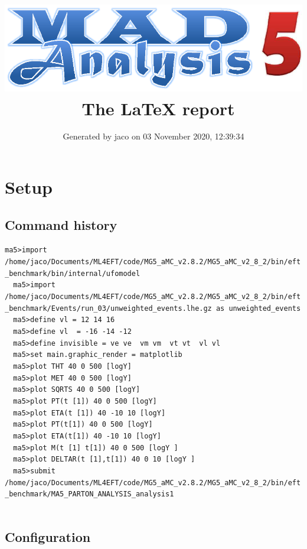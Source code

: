 \documentclass[a4paper, 10pt]{article}
\title{{\includegraphics[scale=.4]{logo.eps}}\ The LaTeX report}
\author{Generated by jaco on 03 November 2020, 12:39:34}
\begin{document}
\maketitle
\flushbottom

\newpage
\section{ Setup}

\subsection{ Command history}

\texttt{ma5>import /\-home/\-jaco/\-Documents/\-ML4EFT/\-code/\-MG5\_aMC\_v2.8.2/\-MG5\_aMC\_v2\_8\_2/\-bin/\-eft\_benchmark/\-bin/\-internal/\-ufomodel\\
}
\texttt{ }\texttt{ }\texttt{ma5>import /\-home/\-jaco/\-Documents/\-ML4EFT/\-code/\-MG5\_aMC\_v2.8.2/\-MG5\_aMC\_v2\_8\_2/\-bin/\-eft\_benchmark/\-Events/\-run\_03/\-unweighted\_events.lhe.gz as unweighted\_events\\
}
\texttt{ }\texttt{ }\texttt{ma5>define vl = 12 14 16\\
}
\texttt{ }\texttt{ }\texttt{ma5>define vl~ = -16 -14 -12\\
}
\texttt{ }\texttt{ }\texttt{ma5>define invisible = ve ve~ vm vm~ vt vt~ vl vl~\\
}
\texttt{ }\texttt{ }\texttt{ma5>set main.graphic\_render = matplotlib\\
}
\texttt{ }\texttt{ }\texttt{ma5>plot THT   40 0 500 [logY]\\
}
\texttt{ }\texttt{ }\texttt{ma5>plot MET   40 0 500 [logY]\\
}
\texttt{ }\texttt{ }\texttt{ma5>plot SQRTS 40 0 500 [logY]\\
}
\texttt{ }\texttt{ }\texttt{ma5>plot  PT(t~[1]) 40 0  500 [logY]\\
}
\texttt{ }\texttt{ }\texttt{ma5>plot ETA(t~[1]) 40 -10 10 [logY]\\
}
\texttt{ }\texttt{ }\texttt{ma5>plot  PT(t[1]) 40 0  500 [logY]\\
}
\texttt{ }\texttt{ }\texttt{ma5>plot ETA(t[1]) 40 -10 10 [logY]\\
}
\texttt{ }\texttt{ }\texttt{ma5>plot M(t~[1] t[1]) 40 0  500 [logY ]\\
}
\texttt{ }\texttt{ }\texttt{ma5>plot DELTAR(t~[1],t[1]) 40 0 10 [logY ]\\
}
\texttt{ }\texttt{ }\texttt{ma5>submit /\-home/\-jaco/\-Documents/\-ML4EFT/\-code/\-MG5\_aMC\_v2.8.2/\-MG5\_aMC\_v2\_8\_2/\-bin/\-eft\_benchmark/\-MA5\_PARTON\_ANALYSIS\_analysis1\\
}
\texttt{ }\texttt{ }\subsection{ Configuration}
\end{document}
